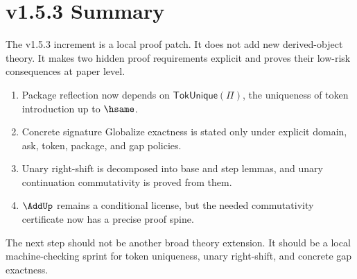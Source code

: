 \chapter{v1.5.3 Summary}
\label{ch:v153-summary}

The v1.5.3 increment is a local proof patch. It does not add new derived-object theory. It makes two hidden proof requirements explicit and proves their low-risk consequences at paper level.

\begin{enumerate}
  \item Package reflection now depends on \(\mathsf{TokUnique}(\Pi)\), the uniqueness of token introduction up to \(\hsame\).
  \item Concrete signature Globalize exactness is stated only under explicit domain, ask, token, package, and gap policies.
  \item Unary right-shift is decomposed into base and step lemmas, and unary continuation commutativity is proved from them.
  \item \(\AddUp\) remains a conditional license, but the needed commutativity certificate now has a precise proof spine.
\end{enumerate}

The next step should not be another broad theory extension. It should be a local machine-checking sprint for token uniqueness, unary right-shift, and concrete gap exactness.
